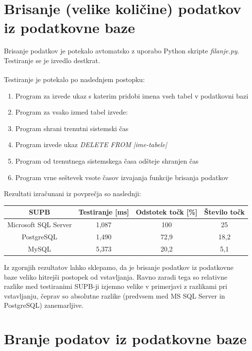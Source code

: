 \documentclass[a4paper,11pt]{report}
\begin{document}
\section{Brisanje (velike količine) podatkov iz podatkovne baze}
Brisanje podatkov je potekalo avtomatsko z uporabo Python skripte \textit{filanje.py}. Testiranje se je izvedlo destkrat.
\\\\

Testiranje je potekalo po naslednjem postopku:
\begin{enumerate}
   \item Program za izvede ukaz s katerim pridobi imena vseh tabel v podatkovni bazi
   \item Program za vsako izmed tabel izvede:
      \item Program shrani trenutni sistemski čas
      \item Program izvede ukaz \textit{DELETE FROM |ime-tabele|}
      \item Program od trenutnega sistemskega časa odšteje shranjen čas
   \item Program vrne seštevek vsote časov izvajanja funkcije brisanja podatkov
\end{enumerate}

Rezultati izračunani iz povprečja so naslednji:
\begin{center}
   \begin{tabular}{||c|c|c|c||}
      \hline
      \textbf{SUPB} & \textbf{Testiranje [ms]} & \textbf{Odstotek točk [\%] } & \textbf{Število točk}\\
      \hline
      \hline
      Microsoft SQL Server & 1,087 & 100 & 25\\
      PostgreSQL & 1,490 & 72,9 & 18,2\\
      MySQL & 5,373 & 20,2 & 5,1\\
      \hline
   \end{tabular}
\end{center}

Iz zgornjih rezultatov lahko sklepamo, da je brisanje podatkov iz podatkovne baze veliko hitrejši postopek od vstavljanja.
Ravno zaradi tega so relativne razlike med testiranimi SUPB-ji izjemno velike v primerjavi z razlikami pri vstavljanju, čeprav
so absolutne razlike (predvsem med MS SQL Server in PostgreSQL) zanemarljive.

\section{Branje podatov iz podatkovne baze}
\end{document}
